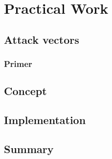 \chapter{Practical Work}

\section{Attack vectors}

\subsection{Primer}

\section{Concept}

\section{Implementation}

\section{Summary}